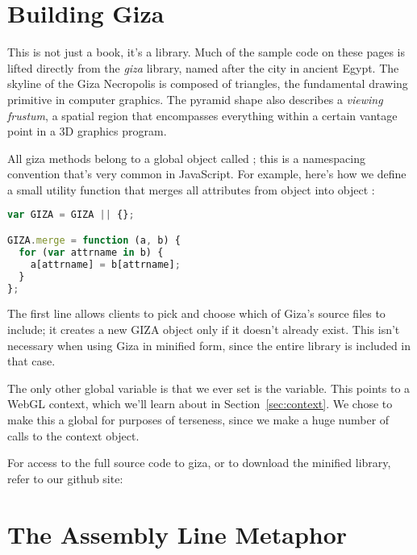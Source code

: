 \section{Building Giza}

This is not just a book, it's a library.  Much of the sample code on these pages is lifted directly from the \emph{giza} library, named after the city in ancient Egypt.  The skyline of the Giza Necropolis is composed of triangles, the fundamental drawing primitive in computer graphics.  The pyramid shape also describes a \emph{viewing frustum}, a spatial region that encompasses everything within a certain vantage point in a 3D graphics program.

All giza methods belong to a global object called ; this is a namespacing convention that's very common in JavaScript.  For example, here's how we define a small utility function that merges all attributes from object  into object :

\begin{lstlisting}[language=JavaScript]
var GIZA = GIZA || {};

GIZA.merge = function (a, b) {
  for (var attrname in b) {
    a[attrname] = b[attrname];
  }
};
\end{lstlisting}

The first line allows clients to pick and choose which of Giza's source files to include; it creates a new GIZA object only if it doesn't already exist.  This isn't necessary when using Giza in minified form, since the entire library is included in that case.

The only other global variable is that we ever set is the  variable.  This points to a WebGL context, which we'll learn about in Section~\ref{sec:context}.  We chose to make this a global for purposes of terseness, since we make a huge number of calls to the context object.

For access to the full source code to giza, or to download the minified library, refer to our github site:


\section{The Assembly Line Metaphor}

